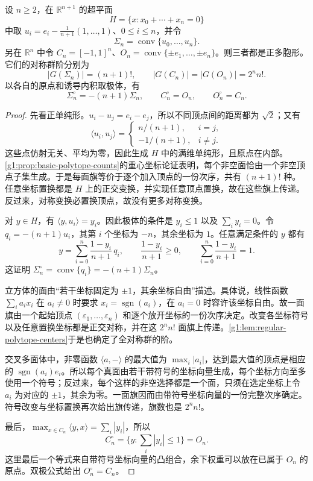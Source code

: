 \begin{proposition}
	\label{g1:prop:regular-classical-polytopes}
	设 \(n\ge2\)，在 \(\mathbb R^{n+1}\) 的超平面
	\[
		H=\{x:x_0+\cdots+x_n=0\}
	\]
	中取 \(u_i=e_i-\frac1{n+1}(1,\ldots,1)\)、\(0\le i\le n\)，并令
	\[
		\Sigma_n=\operatorname{conv}\{u_0,\ldots,u_n\}.
	\]
	另在 \(\mathbb R^n\) 中令 \(C_n=[-1,1]^n\)、\(O_n=\operatorname{conv}\{\pm e_1,\ldots,\pm e_n\}\)。则三者都是正多胞形。它们的对称群阶分别为
	\[
		|G(\Sigma_n)|=(n+1)!,\qquad
		|G(C_n)|=|G(O_n)|=2^n n!.
	\]
	以各自的原点和诱导内积取极体，有
	\begin{equation}
		\label{g1:eq:regular-classical-polarity}
		\Sigma_n^\circ=-(n+1)\Sigma_n,\qquad
		C_n^\circ=O_n,\qquad O_n^\circ=C_n.
	\end{equation}
\end{proposition}
\begin{proof}
	先看正单纯形。\(u_i-u_j=e_i-e_j\)，所以不同顶点间的距离都为 \(\sqrt2\)；又有
	\[
		\langle u_i,u_j\rangle=
		\begin{cases}n/(n+1),&i=j,\\-1/(n+1),&i\ne j.\end{cases}
	\]
	这些点仿射无关、平均为零，因此生成 \(H\) 中的满维单纯形，且原点在内部。\cref{g1:prop:basic-polytope-counts}的重心坐标论证表明，每个非空面恰由一个非空顶点子集生成。于是每面旗等价于逐个加入顶点的一份次序，共有 \((n+1)!\) 种。任意坐标置换都是 \(H\) 上的正交变换，并实现任意顶点置换，故在这些旗上传递。反过来，对称变换必置换顶点，故没有更多对称变换。

	对 \(y\in H\)，有 \(\langle y,u_i\rangle=y_i\)。因此极体的条件是 \(y_i\le1\) 以及 \(\sum_i y_i=0\)。令 \(q_i=-(n+1)u_i\)，其第 \(i\) 个坐标为 \(-n\)，其余坐标为 \(1\)。任意满足条件的 \(y\) 都有
	\[
		y=\sum_{i=0}^n\frac{1-y_i}{n+1}\,q_i,
		\qquad \frac{1-y_i}{n+1}\ge0,\qquad
		\sum_{i=0}^n\frac{1-y_i}{n+1}=1.
	\]
	这证明 \(\Sigma_n^\circ=\operatorname{conv}\{q_i\}=-(n+1)\Sigma_n\)。

	立方体的面由“若干坐标固定为 \(\pm1\)，其余坐标自由”描述。具体说，线性函数 \(\sum_i a_ix_i\) 在 \(a_i\ne0\) 时要求 \(x_i=\operatorname{sgn}(a_i)\)，在 \(a_i=0\) 时容许该坐标自由。故一面旗由一个起始顶点 \((\varepsilon_1,\ldots,\varepsilon_n)\) 和逐个放开坐标的一份次序决定。改变各坐标符号以及任意置换坐标都是正交对称，并在这 \(2^n n!\) 面旗上传递。\cref{g1:lem:regular-polytope-centers}于是也确定了全对称群的阶。

	交叉多面体中，非零函数 \(\langle a,-\rangle\) 的最大值为 \(\max_i|a_i|\)，达到最大值的顶点是相应的 \(\operatorname{sgn}(a_i)e_i\)。所以每个真面由若干带符号的坐标向量生成，每个坐标方向至多使用一个符号；反过来，每个这样的非空选择都是一个面，只须在选定坐标上令 \(a_i\) 为对应的 \(\pm1\)，其余为零。一面旗因而由带符号坐标向量的一份完整次序确定。符号改变与坐标置换再次给出旗传递，旗数也是 \(2^n n!\)。

	最后，\(\max_{x\in C_n}\langle y,x\rangle=\sum_i|y_i|\)，所以
	\[
		C_n^\circ=\{y:\sum_i|y_i|\le1\}=O_n.
	\]
	这里最后一个等式来自带符号坐标向量的凸组合，余下权重可以放在已属于 \(O_n\) 的原点。双极公式给出 \(O_n^\circ=C_n\)。
\end{proof}

